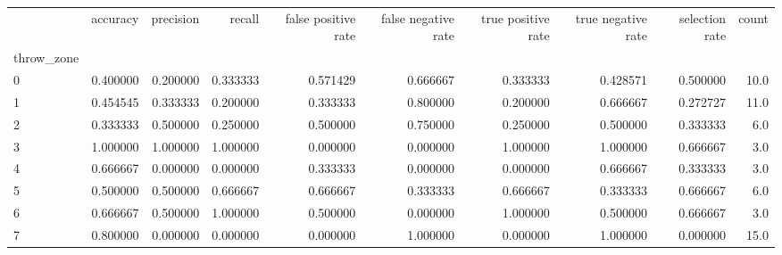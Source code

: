\begin{tabular}{lrrrrrrrrr}
\toprule
{} &  accuracy &  precision &    recall &  false positive rate &  false negative rate &  true positive rate &  true negative rate &  selection rate &  count \\
throw\_zone &           &            &           &                      &                      &                     &                     &                 &        \\
\midrule
0          &  0.400000 &   0.200000 &  0.333333 &             0.571429 &             0.666667 &            0.333333 &            0.428571 &        0.500000 &   10.0 \\
1          &  0.454545 &   0.333333 &  0.200000 &             0.333333 &             0.800000 &            0.200000 &            0.666667 &        0.272727 &   11.0 \\
2          &  0.333333 &   0.500000 &  0.250000 &             0.500000 &             0.750000 &            0.250000 &            0.500000 &        0.333333 &    6.0 \\
3          &  1.000000 &   1.000000 &  1.000000 &             0.000000 &             0.000000 &            1.000000 &            1.000000 &        0.666667 &    3.0 \\
4          &  0.666667 &   0.000000 &  0.000000 &             0.333333 &             0.000000 &            0.000000 &            0.666667 &        0.333333 &    3.0 \\
5          &  0.500000 &   0.500000 &  0.666667 &             0.666667 &             0.333333 &            0.666667 &            0.333333 &        0.666667 &    6.0 \\
6          &  0.666667 &   0.500000 &  1.000000 &             0.500000 &             0.000000 &            1.000000 &            0.500000 &        0.666667 &    3.0 \\
7          &  0.800000 &   0.000000 &  0.000000 &             0.000000 &             1.000000 &            0.000000 &            1.000000 &        0.000000 &   15.0 \\
\bottomrule
\end{tabular}
